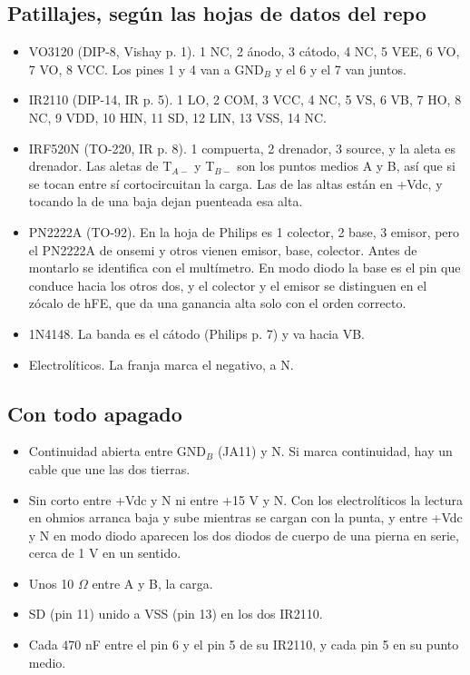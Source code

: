 \documentclass[11pt]{article}
\begin{document}
\subsection*{Patillajes, según las hojas de datos del repo}
\begin{itemize}[leftmargin=*, itemsep=2pt]
  \item VO3120 (DIP-8, Vishay p. 1). 1 NC, 2 ánodo, 3 cátodo, 4 NC, 5 VEE, 6 VO, 7 VO, 8 VCC. Los pines 1 y 4 van a GND$_B$ y el 6 y el 7 van juntos.
  \item IR2110 (DIP-14, IR p. 5). 1 LO, 2 COM, 3 VCC, 4 NC, 5 VS, 6 VB, 7 HO, 8 NC, 9 VDD, 10 HIN, 11 SD, 12 LIN, 13 VSS, 14 NC.
  \item IRF520N (TO-220, IR p. 8). 1 compuerta, 2 drenador, 3 source, y la aleta es drenador. Las aletas de T$_{A-}$ y T$_{B-}$ son los puntos medios A y B, así que si se tocan entre sí cortocircuitan la carga. Las de las altas están en +Vdc, y tocando la de una baja dejan puenteada esa alta.
  \item PN2222A (TO-92). En la hoja de Philips es 1 colector, 2 base, 3 emisor, pero el PN2222A de onsemi y otros vienen emisor, base, colector. Antes de montarlo se identifica con el multímetro. En modo diodo la base es el pin que conduce hacia los otros dos, y el colector y el emisor se distinguen en el zócalo de hFE, que da una ganancia alta solo con el orden correcto.
  \item 1N4148. La banda es el cátodo (Philips p. 7) y va hacia VB.
  \item Electrolíticos. La franja marca el negativo, a N.
\end{itemize}

\subsection*{Con todo apagado}
\begin{itemize}[leftmargin=*, itemsep=2pt]
  \item Continuidad abierta entre GND$_B$ (JA11) y N. Si marca continuidad, hay un cable que une las dos tierras.
  \item Sin corto entre +Vdc y N ni entre +15 V y N. Con los electrolíticos la lectura en ohmios arranca baja y sube mientras se cargan con la punta, y entre +Vdc y N en modo diodo aparecen los dos diodos de cuerpo de una pierna en serie, cerca de 1 V en un sentido.
  \item Unos 10 $\Omega$ entre A y B, la carga.
  \item SD (pin 11) unido a VSS (pin 13) en los dos IR2110.
  \item Cada 470 nF entre el pin 6 y el pin 5 de su IR2110, y cada pin 5 en su punto medio.
\end{itemize}
\end{document}
